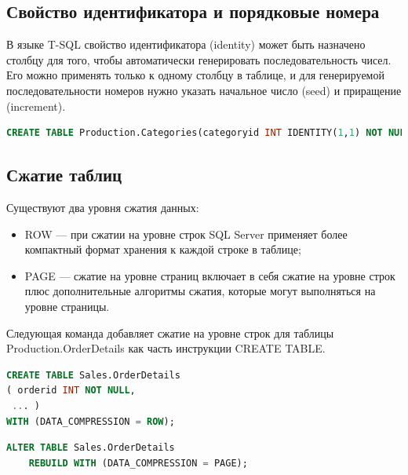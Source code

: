 \subsection{Свойство идентификатора и порядковые номера}
В языке T-SQL свойство идентификатора (identity) может быть назначено столбцу
для того, чтобы автоматически генерировать последовательность чисел. Его можно
применять только к одному столбцу в таблице, и для генерируемой последовательности номеров нужно указать начальное число (seed) и приращение (increment).

\begin{lstlisting}[label=lst:funcReturn, language=sql]
	CREATE TABLE Production.Categories(categoryid INT IDENTITY(1,1) NOT NULL, ... )
\end{lstlisting}

\subsection{Сжатие таблиц}

Существуют два уровня сжатия данных: 

\begin{itemize}
	\item ROW — при сжатии на уровне строк SQL Server применяет более компактный
	формат хранения к каждой строке в таблице; 
	\item PAGE — сжатие на уровне страниц включает в себя сжатие на уровне строк плюс
	дополнительные алгоритмы сжатия, которые могут выполняться на уровне страницы.
\end{itemize}

Следующая команда добавляет сжатие на уровне строк для таблицы
Production.OrderDetails как часть инструкции CREATE TABLE. 

\begin{lstlisting}[label=lst:funcReturn, language=sql]
	CREATE TABLE Sales.OrderDetails
( orderid INT NOT NULL,
 ... )
WITH (DATA_COMPRESSION = ROW);

\end{lstlisting}

\begin{lstlisting}[label=lst:funcReturn, language=sql]
	ALTER TABLE Sales.OrderDetails
	REBUILD WITH (DATA_COMPRESSION = PAGE);
\end{lstlisting}


